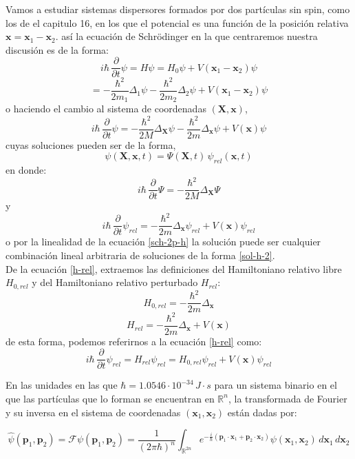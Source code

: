 \documentclass[12pt]{book}
\numberwithin{equation}{chapter}
\def\R{\mathbb{R}}
\def\F{\mathcal{F}}
\def\x{\mathbf{x}}
\def\xx{\mathbf{X}}
\def\P{\mathbf{p}}
\begin{document}
Vamos a estudiar sistemas dispersores formados por dos part\'iculas sin spin, como los de el capitulo 16, en los que el potencial es una funci\'on de la posici\'on relativa $\x= \x_{1} - \x_{2} $. as\'i la ecuaci\'on de Schr\"odinger en la que centraremos nuestra discusi\'on es de la forma:
$$ i\hbar\, \frac{\partial}{\partial t} \psi= H\psi =H_{0}\psi + V(\x_{1} - \x_{2}) \psi $$
\begin{equation}\label{shc-x12}
=-\frac{\hbar^{2}}{2m_{1}} \Delta_{1}\psi - \frac{\hbar^{2}}{2m_{2}} \Delta_{2} \psi + V(\x_{1} - \x_{2}) \psi
\end{equation}
o haciendo el cambio al sistema de coordenadas $(\xx,\x)$,
\begin{equation}\label{sch-2p-h}
i\hbar \, \frac{\partial}{\partial t} \psi = -\frac{\hbar^{2}}{2M} \Delta_{\xx} \psi - \frac{\hbar^{2}}{2 m} \Delta_{\x} \psi + V(\x) \psi
\end{equation}
cuyas soluciones pueden ser de la forma,
\begin{equation}\label{sol-h-2}
\psi(\xx,\x,t) = \Psi(\xx , t) \, \psi_{rel}(\x,t)
\end{equation}
en donde:
$$ i\hbar \, \frac{\partial}{\partial t} \Psi = -\frac{\hbar^{2}}{2M} \Delta_{\xx} \Psi $$
y
\begin{equation}\label{h-rel}
i\hbar \, \frac{\partial}{\partial t} \psi_{rel}= - \frac{\hbar^{2}}{2 m} \Delta_{\x} \psi_{rel} + V(\x) \psi_{rel}
\end{equation}
o por la linealidad de la ecuaci\'on \eqref{sch-2p-h} la soluci\'on puede ser cualquier combinaci\'on lineal arbitraria de soluciones de la forma \eqref{sol-h-2}.\\
De la ecuaci\'on \eqref{h-rel}, extraemos las definiciones del Hamiltoniano relativo libre $H_{0,rel}$ y  del Hamiltoniano relativo perturbado $H_{rel}$:
$$ H_{0,rel} = - \frac{\hbar^{2}}{2 m} \Delta_{\x}  $$ 
$$ H_{rel} = - \frac{\hbar^{2}}{2 m} \Delta_{\x} + V(\x)  $$
de esta forma, podemos referirnos a la ecuaci\'on \eqref{h-rel} como:
$$ i\hbar \, \frac{\partial}{\partial t} \psi_{rel}= H_{rel} \psi_{rel}= H_{0,rel} \psi_{rel}+ V(\x) \psi_{rel} $$

En las unidades en las que $\hbar= 1.0546 \cdot 10^{-34} \, J \cdot s$ para un sistema binario en el que las part\'iculas que lo forman se encuentran en $\R^{n}$, la transformada de Fourier y su inversa en el sistema de coordenadas $(\x_{1} , \x_{2} )$ est\'an dadas por:

\begin{equation}\label{trans-uf}
\hat{\psi}(\P_{1},\P_{2}) =\F \psi(\P_{1},\P_{2})= \frac{1}{(2\pi \hbar)^{n}} \int_{\R^{2n}} e^{-\frac{i}{\hbar} ( \P_{1}\cdot \x_{1} + \P_{2}\cdot \x_{2} ) } \psi(\x_{1},\x_{2}) \, d\x_{1}\, d\x_{2}
\end{equation}
\end{document}
